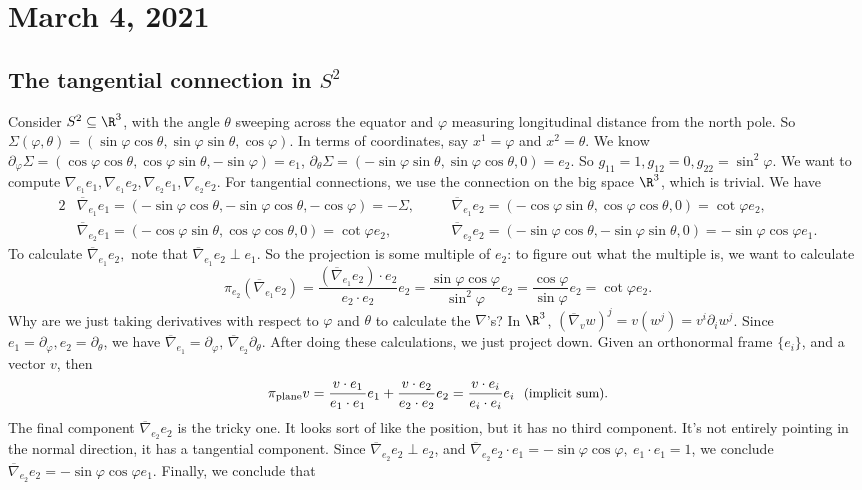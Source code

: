 \section{March 4, 2021} 
\subsection{The tangential connection in $S^2$}
Consider $S^2 \subseteq \R^3$, with the angle $\theta$ sweeping across the equator and $\varphi $ measuring longitudinal distance from the north pole. So $\Sigma(\varphi ,\theta)=(\sin \varphi  \cos \theta, \sin \varphi  \sin \theta, \cos \varphi ).$ In terms of coordinates, say $x^1=\varphi $ and $x^2=\theta$. We know $\partial _{\varphi }\Sigma=(\cos \varphi  \cos \theta, \cos \varphi  \sin \theta, - \sin \varphi )=e_1$, $\partial _{\theta}\Sigma=(-\sin \varphi  \sin \theta, \sin \varphi  \cos \theta, 0)=e_2$. So $g_{11}=1,g_{12}=0,g_{22}=\sin ^2 \varphi $. We want to compute $\nabla _{e_1}e_1,\nabla _{e_1}e_2,\nabla _{e_2}e_1,\nabla _{e_2}e_2$. For tangential connections, we use the connection on the big space $\R^3$, which is trivial. We have
    \begin{alignat*}{2} 
        &\overline{\nabla} _{e_1}e_1=(-\sin \varphi  \cos \theta,-\sin \varphi  \cos \theta, -\cos \varphi )=-\Sigma,\quad &&\overline{ \nabla }_{e_1}e_2=(-\cos \varphi \sin\theta, \cos \varphi  \cos \theta,0)=\cot \varphi e_2,\\
        &\overline{\nabla }_{e_2}e_1=(- \cos \varphi  \sin \theta, \cos \varphi  \cos \theta,0)=\cot \varphi  e_2,&&\overline{\nabla}_{e_2}e_2=(-\sin \varphi  \cos \theta,-\sin \varphi  \sin \theta,0)=-\sin \varphi  \cos \varphi  e_1.
    \end{alignat*}
    To calculate $\overline{\nabla}_{e_1}e_2,$ note that $\overline{\nabla}_{e_1}e_2\perp e_1$. So the projection is some multiple of $e_2$: to figure out what the multiple is, we want to calculate 
    \[
    \pi_{e_2}(\overline{\nabla}_{e_1}e_2)=\frac{(\overline{\nabla}_{e_1}e_2)\cdot e_2}{e_2\cdot e_2}e_2=\frac{ \sin \varphi  \cos \varphi }{\sin ^2 \varphi }e_2=\frac{\cos \varphi }{\sin \varphi }e_2=\cot \varphi e_2.
\] Why are we just taking derivatives with respect to $\varphi $ and $\theta$ to calculate the $\nabla$'s? In $\R^3$, $(\overline{\nabla}_v w)^j =v(w^j )=v^i \partial _i w^j $. Since $e_1=\partial _{\varphi },e_2=\partial _{\theta}$, we have $\overline{\nabla}_{e_1}=\partial _{\varphi },\, \overline{\nabla}_{e_2}\partial _{\theta}$. After doing these calculations, we just project down. Given an orthonormal frame $\{e_i \} $, and a vector $v$, then \[
\pi_{\text{plane} }v= \frac{v\cdot e_1}{e_1\cdot e_1}e_1+\frac{v\cdot e_2}{e_2\cdot e_2}e_2=\frac{v\cdot e_i }{e_i \cdot e_i }e_i \ \ \text{\small(implicit sum).}
\] The final component $\overline{\nabla}_{e_2}e_2$ is the tricky one. It looks sort of like the position, but it has no third component. It's not entirely pointing in the normal direction, it has a tangential component. Since $\overline{\nabla}_{e_2}e_2\perp e_2$, and $\overline{\nabla}_{e_2}e_2\cdot e_1=-\sin \varphi  \cos \varphi ,\ e_1\cdot e_1=1$, we conclude $\overline{\nabla}_{e_2}e_2=-\sin \varphi  \cos \varphi  e_1$. Finally, we conclude that 

